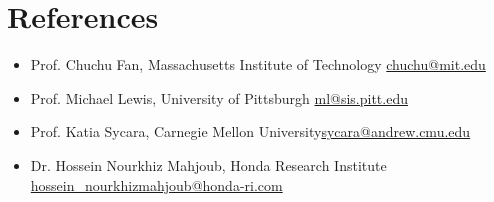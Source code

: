 \documentclass[10pt,letterpaper,roman]{moderncv}        %
\begin{document}




\section{References}



\begin{itemize}
\item Prof. Chuchu Fan, Massachusetts Institute of Technology \hfill \href{mailto:chuchu@mit.edu}{chuchu@mit.edu}
\item Prof. Michael Lewis, University of Pittsburgh \hfill \href{mailto:ml@sis.pitt.edu}{ml@sis.pitt.edu}
\item Prof. Katia Sycara, Carnegie Mellon University\hfill \href{mailto:sycara@andrew.cmu.edu}{sycara@andrew.cmu.edu}
\item Dr. Hossein Nourkhiz Mahjoub, Honda Research Institute \hfill  \href{mailto:hossein_nourkhizmahjoub@honda-ri.com}{hossein\_nourkhizmahjoub@honda-ri.com}





\end{itemize}
\end{document}

